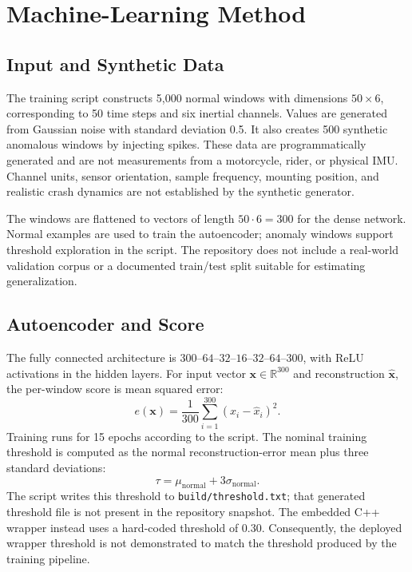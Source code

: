 \documentclass[conference]{IEEEtran}
\begin{document}
\section{Machine-Learning Method}
\subsection{Input and Synthetic Data}
The training script constructs 5,000 normal windows with dimensions $50 \times 6$, corresponding to 50 time steps and six inertial channels. Values are generated from Gaussian noise with standard deviation 0.5. It also creates 500 synthetic anomalous windows by injecting spikes. These data are programmatically generated and are not measurements from a motorcycle, rider, or physical IMU. Channel units, sensor orientation, sample frequency, mounting position, and realistic crash dynamics are not established by the synthetic generator.

The windows are flattened to vectors of length $50 \cdot 6 = 300$ for the dense network. Normal examples are used to train the autoencoder; anomaly windows support threshold exploration in the script. The repository does not include a real-world validation corpus or a documented train/test split suitable for estimating generalization.

\subsection{Autoencoder and Score}
The fully connected architecture is $300$--$64$--$32$--$16$--$32$--$64$--$300$, with ReLU activations in the hidden layers. For input vector $\mathbf{x}\in\mathbb{R}^{300}$ and reconstruction $\hat{\mathbf{x}}$, the per-window score is mean squared error:
\begin{equation}
e(\mathbf{x})=\frac{1}{300}\sum_{i=1}^{300}(x_i-\hat{x}_i)^2.
\end{equation}
Training runs for 15 epochs according to the script. The nominal training threshold is computed as the normal reconstruction-error mean plus three standard deviations:
\begin{equation}
\tau = \mu_{\mathrm{normal}} + 3\sigma_{\mathrm{normal}}.
\end{equation}
The script writes this threshold to \texttt{build/threshold.txt}; that generated threshold file is not present in the repository snapshot. The embedded C++ wrapper instead uses a hard-coded threshold of 0.30. Consequently, the deployed wrapper threshold is not demonstrated to match the threshold produced by the training pipeline.
\end{document}
